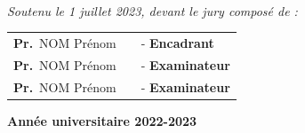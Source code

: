 \documentclass[a4paper,12pt]{report}
\begin{document}
\begin{titlepage}
\begin{center}
\begin{minipage}{0.5\textwidth}
\end{minipage}\\[1cm]

{\large \textit{Soutenu le 1 juillet 2023, devant le jury composé de : }}\\[0.5cm]

\color{black}
\centering
\begin{tabular}{ccl}
\large \textbf{Pr.}~\textsc{NOM} Prénom & \hspace{3cm} & \large - \textbf{Encadrant} \\[0.1cm]
\large \textbf{Pr.}~\textsc{NOM} Prénom  &  \hspace{3cm}  & \large - \textbf{Examinateur} \\[0.1cm]
\large \textbf{Pr.}~\textsc{NOM} Prénom  &  \hspace{3cm}  & \large - \textbf{Examinateur}
\end{tabular}

\vfill

{\textbf{\large {Année universitaire} 2022-2023}}

\end{center}
\end{titlepage}
\end{document}
